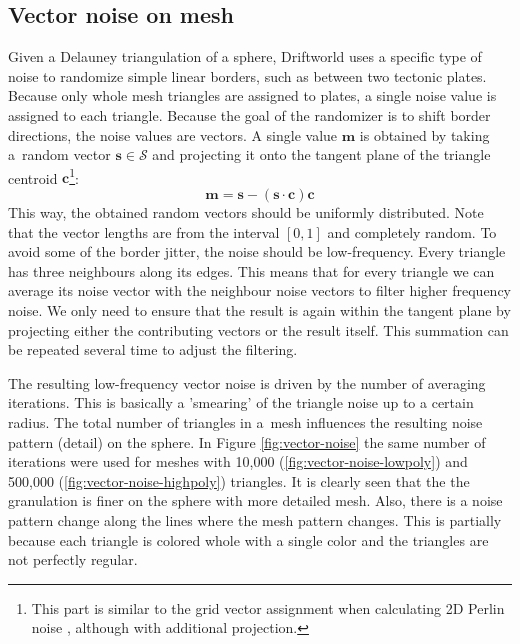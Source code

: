 \subsection{Vector noise on mesh}
\label{subsec:vector-noise-on-mesh}
Given a Delauney triangulation of a sphere, Driftworld uses a specific type of noise to randomize simple linear borders, such as between two tectonic plates. Because only whole mesh triangles are assigned to plates, a single noise value is assigned to each triangle. Because the goal of the randomizer is to shift border directions, the noise values are vectors. A single value $\mathbf{m}$ is obtained by taking a~random vector $\mathbf{s}\in\mathcal{S}$ and projecting it onto the tangent plane of the triangle centroid $\mathbf{c}$\footnote{This part is similar to the grid vector assignment when calculating 2D Perlin noise \cite{perlinnoise}, although with additional projection.}:
$$\mathbf{m} = \mathbf{s}-(\mathbf{s}\cdot\mathbf{c})\mathbf{c}$$
This way, the obtained random vectors should be uniformly distributed. Note that the vector lengths are from the interval $[0,1]$ and completely random. To avoid some of the border jitter, the noise should be low-frequency. Every triangle has three neighbours along its edges. This means that for every triangle we can average its noise vector with the neighbour noise vectors to filter higher frequency noise. We only need to ensure that the result is again within the tangent plane by projecting either the contributing vectors or the result itself. This summation can be repeated several time to adjust the filtering. 

The resulting low-frequency vector noise is driven by the number of averaging iterations. This is basically a 'smearing' of the triangle noise up to a certain radius. The total number of triangles in a~mesh influences the resulting noise pattern (detail) on the sphere. In Figure \ref{fig:vector-noise} the same number of iterations were used for meshes with 10,000 (\ref{fig:vector-noise-lowpoly}) and 500,000 (\ref{fig:vector-noise-highpoly}) triangles. It is clearly seen that the the granulation is finer on the sphere with more detailed mesh. Also, there is a noise pattern change along the lines where the mesh pattern changes. This is partially because each triangle is colored whole with a single color and the triangles are not perfectly regular.

